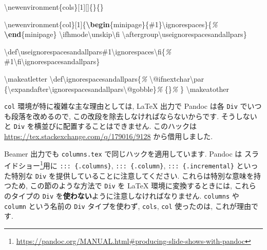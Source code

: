 \documentclass[
  11pt,
  lualatex,
  ja=standard]{bxjsreport}
\newenvironment{Shaded}{\begin{snugshade}}{\end{snugshade}}
\newcommand{\CommentTok}[1]{\textcolor[rgb]{0.56,0.35,0.01}{\textit{#1}}}
\newcommand{\ExtensionTok}[1]{#1}
\newcommand{\FunctionTok}[1]{\textcolor[rgb]{0.00,0.00,0.00}{#1}}
\newcommand{\KeywordTok}[1]{\textcolor[rgb]{0.13,0.29,0.53}{\textbf{#1}}}
\newcommand{\NormalTok}[1]{#1}
\renewcommand{\href}[2]{#2\footnote{\url{#1}}}
\begin{document}
\begin{Shaded}
\begin{Highlighting}[]
\FunctionTok{\textbackslash{}newenvironment}\NormalTok{\{cols\}[1][]\{\}\{\}}

\FunctionTok{\textbackslash{}newenvironment}\NormalTok{\{col\}[1]\{}\KeywordTok{\textbackslash{}begin}\NormalTok{\{}\ExtensionTok{minipage}\NormalTok{\}\{\#1\}}\FunctionTok{\textbackslash{}ignorespaces}\NormalTok{\}\{}\CommentTok{\%}
\KeywordTok{\textbackslash{}end}\NormalTok{\{}\ExtensionTok{minipage}\NormalTok{\}}
\FunctionTok{\textbackslash{}ifhmode\textbackslash{}unskip\textbackslash{}fi}
\FunctionTok{\textbackslash{}aftergroup\textbackslash{}useignorespacesandallpars}\NormalTok{\}}

\FunctionTok{\textbackslash{}def\textbackslash{}useignorespacesandallpars}\NormalTok{\#1}\FunctionTok{\textbackslash{}ignorespaces\textbackslash{}fi}\NormalTok{\{}\CommentTok{\%}
\NormalTok{\#1}\FunctionTok{\textbackslash{}fi\textbackslash{}ignorespacesandallpars}\NormalTok{\}}

\FunctionTok{\textbackslash{}makeatletter}
\FunctionTok{\textbackslash{}def\textbackslash{}ignorespacesandallpars}\NormalTok{\{}\CommentTok{\%}
  \FunctionTok{\textbackslash{}@ifnextchar\textbackslash{}par}
\NormalTok{    \{}\FunctionTok{\textbackslash{}expandafter\textbackslash{}ignorespacesandallpars\textbackslash{}@gobble}\NormalTok{\}}\CommentTok{\%}
\NormalTok{    \{\}}\CommentTok{\%}
\NormalTok{\}}
\FunctionTok{\textbackslash{}makeatother}
\end{Highlighting}
\end{Shaded}

\texttt{col} 環境が特に複雑な主な理由としては, LaTeX 出力で Pandoc は各 \texttt{Div} でいつも段落を改めるので, この改段を除去しなければならないからです. そうしないと \texttt{Div} を横並びに配置することはできません. このハックは \url{https://tex.stackexchange.com/q/179016/9128} から借用しました.

Beamer 出力でも \texttt{columns.tex} で同じハックを適用しています. Pandoc は \href{https://pandoc.org/MANUAL.html\#producing-slide-shows-with-pandoc}{スライドショー}用に \texttt{::: \{.columns\}}, \texttt{::: \{.column\}}, \texttt{::: \{.incremental\}} といった特別な \texttt{Div} を提供していることに注意してください. これらは特別な意味を持つため, この節のような方法で \texttt{Div} を LaTeX 環境に変換するときには, これらのタイプの \texttt{Div} を\textbf{使わない}ように注意しなければなりません. \texttt{columns} や \texttt{column} という名前の \texttt{Div} タイプを使わず, \texttt{cols}, \texttt{col} 使ったのは, これが理由です.
\end{document}
